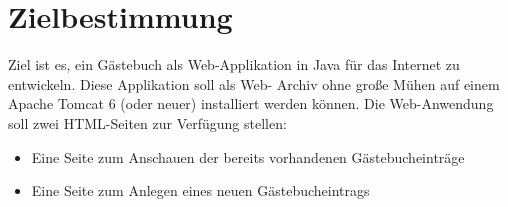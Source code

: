 \section{Zielbestimmung}
 
Ziel ist es, ein Gästebuch als Web-Applikation in Java für das Internet zu entwickeln. Diese Applikation soll als Web-
Archiv ohne große Mühen auf einem Apache Tomcat 6 (oder neuer) installiert werden können.
Die Web-Anwendung soll zwei HTML-Seiten zur Verfügung stellen:

\begin{itemize}
\item Eine Seite zum Anschauen der bereits vorhandenen Gästebucheinträge
\item Eine Seite zum Anlegen eines neuen Gästebucheintrags
\end{itemize}
